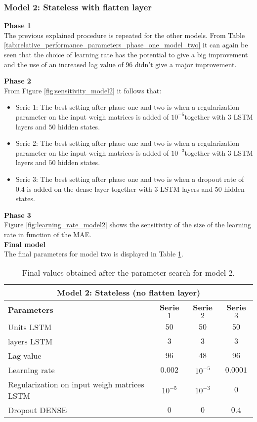 \clearpage
\subsubsection{Model 2: Stateless with flatten layer}

\textbf{Phase 1}\\
The previous explained procedure is repeated for the other models. From Table \ref{tab:relative_performance_parameters_phase_one_model_two} it can again be seen that the choice of learning rate has the potential to give a big improvement and the use of an increased lag value of $ 96 $ didn't give a major improvement. 

\textbf{Phase 2}\\
From Figure \ref{fig:sensitivity_model2} it follows that:
\begin{itemize}
	\item Serie 1: The best setting after phase one and two is when a regularization parameter on the input weigh matrices is added of $ 10^{-5} $together with $ 3 $ LSTM layers and $ 50 $ hidden states. 
	\item Serie 2: The best setting after phase one and two is when a regularization parameter on the input weigh matrices is added of $ 10^{-3} $together with $ 3 $ LSTM layers and $ 50 $ hidden states.
	\item Serie 3: The best setting after phase one and two is when a dropout rate of $ 0.4 $ is added on the dense layer together with $ 3 $ LSTM layers and $ 50 $ hidden states.
\end{itemize}

\textbf{Phase 3}\\
Figure \ref{fig:learning_rate_model2} shows the sensitivity of the size of the learning rate in function of the MAE.\\

\textbf{Final model}\\
The final parameters for model two is displayed in Table \ref{tab:final_model2}.

\begin{table}[h]
	\centering
	\begin{tabular}{@{}l|ccc@{}} \toprule
		\multicolumn{4}{c}{Model 2: Stateless (no flatten layer)}\\\midrule\midrule
		\textbf{Parameters}	& \textbf{Serie $ 1 $} & \textbf{Serie $ 2 $} & \textbf{Serie $ 3 $}\\\midrule
		Units LSTM & $50 $&$ 50 $  & $50 $\\
		layers LSTM & $3 $&$ 3 $  & $3$\\
		Lag value & $96 $&$ 48$  & $96$\\
		Learning rate & $0.002 $&$ 10^{-5}$  & $0.0001$\\\hline
		Regularization on input weigh matrices LSTM   & $ 10^{-5} $ & $ 10^{-3} $ & $ 0 $\\
		Dropout DENSE   & $ 0 $ & $ 0 $ & $ 0.4 $\\\bottomrule
	\end{tabular}
	\caption{Final values obtained after the parameter search for model 2.}
	\label{tab:final_model2}
\end{table}

